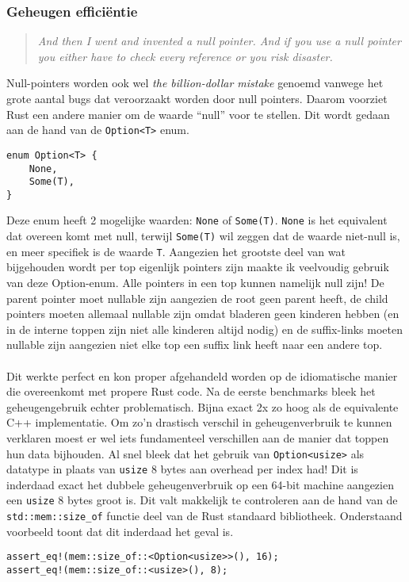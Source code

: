 \subsubsection{Geheugen efficiëntie}
\begin{quote}
    \textit{And then I went and invented a null pointer.
    And if you use a null pointer you either have to check every reference or you risk disaster. \cite{null_mistake}}
\end{quote}
Null-pointers worden ook wel \textit{the billion-dollar mistake} genoemd vanwege het grote aantal bugs dat veroorzaakt worden door null pointers.
Daarom voorziet Rust een andere manier om de waarde ``null'' voor te stellen.
Dit wordt gedaan aan de hand van de \texttt{Option<T>} enum.

\begin{verbatim}
enum Option<T> {
    None,
    Some(T),
}
\end{verbatim}

Deze enum heeft 2 mogelijke waarden: \texttt{None} of \texttt{Some(T)}.
\texttt{None} is het equivalent dat overeen komt met null, terwijl \texttt{Some(T)} wil zeggen dat de waarde niet-null is, en meer specifiek is de waarde \texttt{T}.
Aangezien het grootste deel van wat bijgehouden wordt per top eigenlijk pointers zijn maakte ik veelvoudig gebruik van deze Option-enum.
Alle pointers in een top kunnen namelijk null zijn!
De parent pointer moet nullable zijn aangezien de root geen parent heeft, de child pointers moeten allemaal nullable zijn omdat bladeren geen kinderen hebben (en in de interne toppen zijn niet alle kinderen altijd nodig) en de suffix-links moeten nullable zijn aangezien niet elke top een suffix link heeft naar een andere top.
\\ \\
Dit werkte perfect en kon proper afgehandeld worden op de idiomatische manier die overeenkomt met propere Rust code.
Na de eerste benchmarks bleek het geheugengebruik echter problematisch.
Bijna exact 2x zo hoog als de equivalente C++ implementatie.
Om zo'n drastisch verschil in geheugenverbruik te kunnen verklaren moest er wel iets fundamenteel verschillen aan de manier dat toppen hun data bijhouden.
Al snel bleek dat het gebruik van \texttt{Option<usize>} als datatype in plaats van \texttt{usize} 8 bytes aan overhead per index had!
Dit is inderdaad exact het dubbele geheugenverbruik op een 64-bit machine aangezien een \texttt{usize} 8 bytes groot is.
Dit valt makkelijk te controleren aan de hand van de \texttt{std::mem::size\_of} functie deel van de Rust standaard bibliotheek.
Onderstaand voorbeeld toont dat dit inderdaad het geval is.
\begin{verbatim}
assert_eq!(mem::size_of::<Option<usize>>(), 16);
assert_eq!(mem::size_of::<usize>(), 8);
\end{verbatim}

